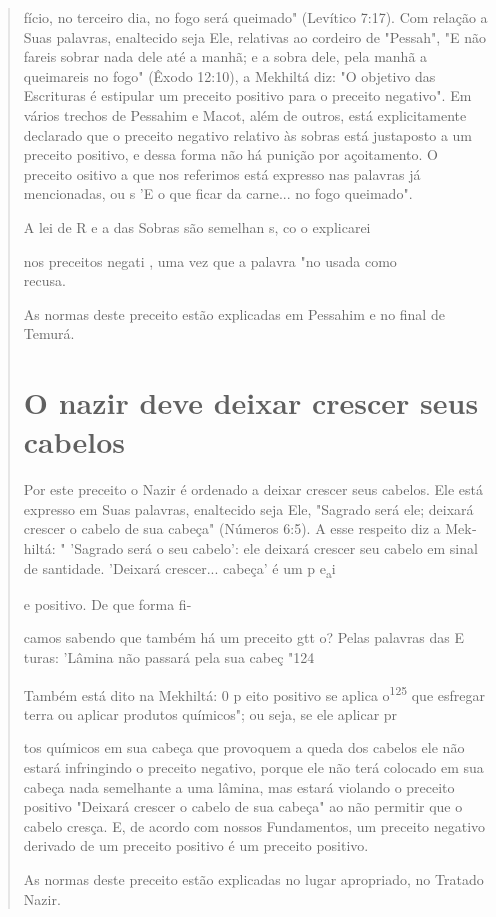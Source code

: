 \begin{quote}


fício, no terceiro dia, no fogo será queimado" (Levítico 7:17). Com
relação a Suas palavras, enaltecido seja Ele, relativas ao cordeiro de
"Pessah", "E não fareis so­brar nada dele até a manhã; e a sobra dele,
pela manhã a queimareis no fogo" (Êxodo 12:10), a Mekhiltá diz: "O
objetivo das Escrituras é estipular um preceito positivo para o preceito
negativo". Em vários trechos de Pessahim e Macot, além de outros, está
explicitamente declarado que o preceito negativo relativo às so­bras
está justaposto a um preceito positivo, e dessa forma não há punição por
açoitamento. O preceito ositivo a que nos referimos está expresso nas
palavras já mencionadas, ou s 'E o que ficar da carne... no fogo
queimado".

A lei de R e a das Sobras são semelhan s, co o explicarei

nos preceitos negati , uma vez que a palavra "no usada como\\
recusa.

As normas deste preceito estão explicadas em Pessahim e no final de
Temurá.

\section{O nazir deve deixar crescer seus cabelos}

Por este preceito o Nazir é ordenado a deixar crescer seus cabelos. Ele
está expresso em Suas palavras, enaltecido seja Ele, "Sagrado será ele;
dei­xará crescer o cabelo de sua cabeça" (Números 6:5). A esse respeito
diz a Mek­hiltá: " 'Sagrado será o seu cabelo': ele deixará crescer seu
cabelo em sinal de santidade. 'Deixará crescer... cabeça' é um p
e\textsubscript{a}i

e positivo. De que forma fi-

camos sabendo que também há um preceito gtt o? Pelas palavras das E
turas: 'Lâmina não passará pela sua cabeç "124

Também está dito na Mekhiltá: 0 p eito positivo se aplica
o\textsuperscript{125} que esfregar terra ou aplicar produtos químicos";
ou seja, se ele aplicar pr

tos químicos em sua cabeça que provoquem a queda dos cabelos ele não
estará infringindo o preceito negativo, porque ele não terá colocado em
sua cabeça nada semelhante a uma lâmina, mas estará violando o preceito
positivo "Dei­xará crescer o cabelo de sua cabeça" ao não permitir que o
cabelo cresça. E, de acordo com nossos Fundamentos, um preceito negativo
derivado de um pre­ceito positivo é um preceito positivo.

As normas deste preceito estão explicadas no lugar apropriado, no
Tratado Nazir.
\end{quote}

